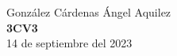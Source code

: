 \documentclass[a4paper,12pt]{report}
\begin{document}
\centering
\Large{González Cárdenas Ángel Aquilez} \\
\textbf{3CV3} \\
14 de septiembre del 2023
\end{document}
